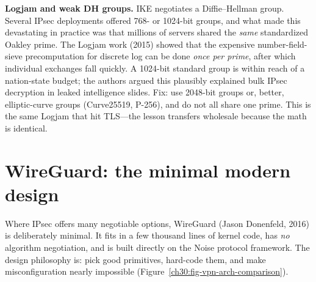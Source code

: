 \begin{attackbox}
\textbf{Logjam and weak DH groups.} IKE negotiates a Diffie--Hellman group. Several IPsec deployments offered 768- or 1024-bit groups, and what made this devastating in practice was that millions of servers shared the \emph{same} standardized Oakley prime. The Logjam work (2015) showed that the expensive number-field-sieve precomputation for discrete log can be done \emph{once per prime}, after which individual exchanges fall quickly. A 1024-bit standard group is within reach of a nation-state budget; the authors argued this plausibly explained bulk IPsec decryption in leaked intelligence slides. Fix: use 2048-bit groups or, better, elliptic-curve groups (Curve25519, P-256), and do not all share one prime. This is the same Logjam that hit TLS---the lesson transfers wholesale because the math is identical.
\end{attackbox}

\section{WireGuard: the minimal modern design}
\label{ch30:wireguard}

Where IPsec offers many negotiable options, WireGuard (Jason Donenfeld, 2016) is deliberately minimal. It fits in a few thousand lines of kernel code, has \emph{no} algorithm negotiation, and is built directly on the Noise protocol framework. The design philosophy is: pick good primitives, hard-code them, and make misconfiguration nearly impossible (Figure~\ref{ch30:fig-vpn-arch-comparison}).

